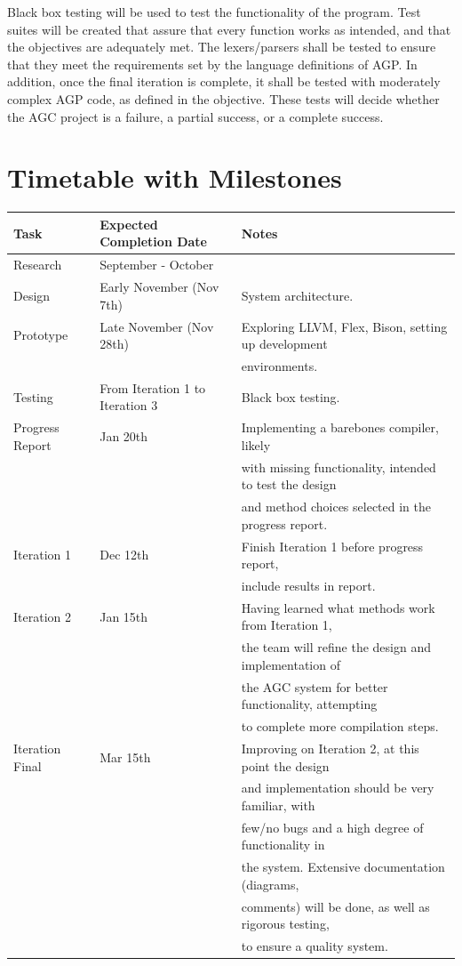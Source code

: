 \documentclass[11pt]{article}
\begin{document}
Black box testing will be used to test the functionality of the program. Test suites will be created that assure that every function works as intended, and that the objectives are adequately met. The lexers/parsers shall be tested to ensure that they meet the requirements set by the language definitions of AGP. In addition, once the final iteration is complete, it shall be tested with moderately complex AGP code, as defined in the objective. These tests will decide whether the AGC project is a failure, a partial success, or a complete success.

\pagebreak

\section{Timetable with Milestones}

\begin{center}
\begin{tabular}{ |l | l | l|  }
 \hline
 \textbf{Task} & \textbf{Expected Completion Date} & \textbf{Notes} \\
 \hline 
 Research & September - October &  \\
 \hline 
 Design & Early November (Nov 7th)  & System architecture. \\
 \hline
 Prototype & Late November (Nov 28th) & Exploring LLVM, Flex, Bison, setting up development \\
 	    & & environments. \\
 \hline
 Testing & From Iteration 1 to Iteration 3 & Black box testing. \\
 \hline
 Progress Report & Jan 20th & Implementing a barebones compiler, likely\\
 		 & & with missing functionality, intended to test the design \\
 		 & & and method choices selected in the progress report.\\
 \hline
 Iteration 1 & Dec 12th  & Finish Iteration 1 before progress report, \\
 		 & & include results in report.\\
 \hline
 Iteration 2 & Jan 15th & Having learned what methods work from Iteration 1, \\
 		 & & the team will refine the design and implementation of \\ 		             		 & & the AGC system for better functionality, attempting \\
 		 & & to complete more compilation steps.\\
 \hline
 Iteration Final & Mar 15th & Improving on Iteration 2, at this point the design\\
 		 & & and implementation should be very familiar, with\\
 		 & & few/no bugs and a high degree of functionality in \\
 		 & & the system. Extensive documentation (diagrams, \\
 		 & & comments) will be done, as well as rigorous testing, \\
 		 & & to ensure a quality system.\\
 \hline
\end{tabular}
\end{center}
\end{document}
